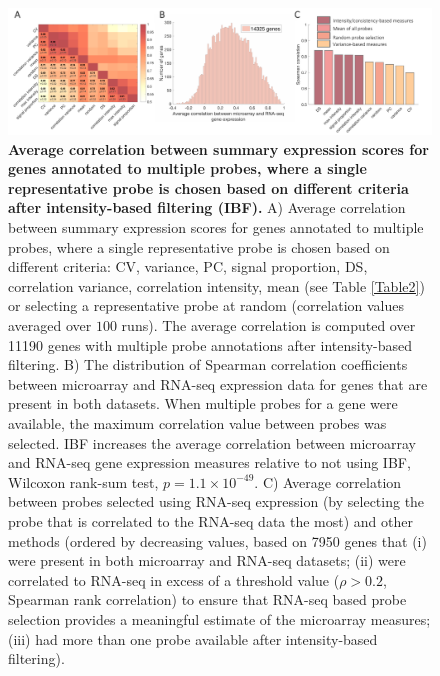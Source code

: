 \documentclass[10pt,A4]{article}
\begin{document}
\newpage

\begin{figure}[h!]
  \centering
    \includegraphics[width=1\textwidth]{FigureS1.pdf}
\caption{\textbf{Average correlation between summary expression scores for genes annotated to multiple probes, where a single representative probe is chosen based on different criteria after intensity-based filtering (IBF).}
A) Average correlation between summary expression scores for genes annotated to multiple probes, where a single representative probe is chosen based on different criteria: CV, variance, PC, signal proportion, DS, correlation variance, correlation intensity, mean (see Table \ref{Table2}) or selecting a representative probe at random (correlation values averaged over $100$ runs). The average correlation is computed over \num{11190} genes with multiple probe annotations after intensity-based filtering. B) The distribution of Spearman correlation coefficients between microarray and RNA-seq expression data for genes that are present in both datasets. When multiple probes for a gene were available, the maximum correlation value between probes was selected. IBF increases the average correlation between microarray and RNA-seq gene expression measures relative to not using IBF, Wilcoxon rank-sum test, $p=1.1 \times 10^{-49}$. C) Average correlation between probes selected using RNA-seq expression (by selecting the probe that is correlated to the RNA-seq data the most) and other methods (ordered by decreasing values, based on \num{7950} genes that (i) were present in both microarray and RNA-seq datasets; (ii) were correlated to RNA-seq in excess of a threshold value ($\rho > 0.2$, Spearman rank correlation) to ensure that RNA-seq based probe selection provides a meaningful estimate of the microarray measures; (iii) had more than one probe available after intensity-based filtering). }
\label{fig:Ch4Sfig1}
\end{figure}
\end{document}
